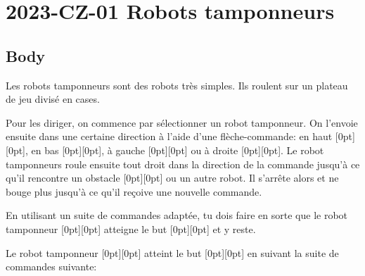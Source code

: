 \documentclass[a4paper,11pt]{report}
\newcommand{\taskGraphicsFolder}{..}
\begin{document}
\section*{\centering{} 2023-CZ-01 Robots tamponneurs}


\subsection*{Body}

Les robots tamponneurs sont des robots très simples. Ils roulent sur un plateau de jeu divisé en cases.

{\centering%
\par}

Pour les diriger, on commence par sélectionner un robot tamponneur. On l’envoie ensuite dans une certaine direction à l’aide d’une flèche-commande: en haut \raisebox{-0.5ex}[0pt][0pt]{}, en bas \raisebox{-0.5ex}[0pt][0pt]{}, à gauche \raisebox{-0.5ex}[0pt][0pt]{} ou à droite \raisebox{-0.5ex}[0pt][0pt]{}. Le robot tamponneurs roule ensuite tout droit dans la direction de la commande jusqu’à ce qu’il rencontre un obstacle \raisebox{-0.5ex}[0pt][0pt]{} ou un autre robot. Il s’arrête alors et ne bouge plus jusqu’à ce qu’il reçoive une nouvelle commande.

En utilisant un suite de commandes adaptée, tu dois faire en sorte que le robot tamponneur \raisebox{-0.5ex}[0pt][0pt]{} atteigne le but \raisebox{-0.5ex}[0pt][0pt]{} et y reste.

Le robot tamponneur \raisebox{-0.5ex}[0pt][0pt]{} atteint le but \raisebox{-0.5ex}[0pt][0pt]{} en suivant la suite de commandes suivante:
\end{document}

